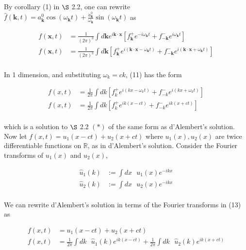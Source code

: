 \documentclass[]{article}
\begin{document}
By corollary (1) in $\S$ 2.2, one can rewrite $\hat{f}(\bm{k},t) = a^0_{\bm{k}} \cos( \omega_{\bm{k}} t) + \frac{\dot{a}^0_{\bm{k}}}{\omega_{\bm{k}}}\sin( \omega_{\bm{k}} t)$ as 

\begin{equation}
\begin{split}
f(\bm{x},t) & = \frac{1}{(2\pi)^3}\int d\bm{k}e^{i\bm{k}\cdot\bm{x}}  \left[ f^+_{\bm{k}} e^{-i\omega_{\bm{k}}t} + f^-_{-\bm{k}} e^{i\omega_{\bm{k}}t}   \right] \\
f(\bm{x},t) & = \frac{1}{(2\pi)^3}\int d\bm{k}  \left[ f^+_{\bm{k}} e^{i(\bm{k}\cdot\bm{x}-\omega_{\bm{k}} t )} + f^-_{-\bm{k}} e^{  i(\bm{k}\cdot\bm{x}+  \omega_{\bm{k}} t  ) }   \right] \\
\end{split}
\end{equation}

In 1 dimension, and substituting $\omega_k = ck$, (11) has the form 

\begin{equation}
\begin{split}
f(x,t) & = \frac{1}{2\pi}\int dk  \left[ f^+_{k} e^{i(kx-\omega_{k} t )} + f^-_{-k} e^{  i(kx+  \omega_{k} t  ) }   \right] \\
f(x,t) & = \frac{1}{2\pi}\int dk  \left[ f^+_{k} e^{ i k ( x - c t )} + f^-_{-k} e^{  i k( x +  c t  ) }   \right] \\
\end{split}
\end{equation}

which is a solution to $\S$ 2.2 $(\ast)$ of the same form as d’Alembert's solution. \\
Now let $f(x,t) = u_1(x-ct) + u_2(x+ct)$ where $u_1(x),u_2(x)$ are twice differentiable functions on $\mathbb{R}$, as in d’Alembert's solution. Consider the Fourier transforms of $u_1(x)$ and $u_2(x)$,

\begin{equation}
\begin{split}
\hat{u}_1(k) & := \int dx \text{ }u_1(x) e^{-ikx} \\
\hat{u}_2(k) & := \int dx \text{ }u_2(x) e^{-ikx} \\
\end{split}
\end{equation}

We can rewrite d’Alembert's solution in terms of the Fourier transforms in (13) as

\begin{equation}
\begin{split}
f(x,t) & = u_1(x-ct) + u_2(x+ct)  \\ 
f(x,t) & = \frac{1}{2\pi} \int dk \text{ } \hat{u}_1(k) e^{ik(x-ct)} + \frac{1}{2\pi} \int dk \text{ } \hat{u}_2(k) e^{ik(x+ct)} \\
\end{split}
\end{equation}
\end{document}
